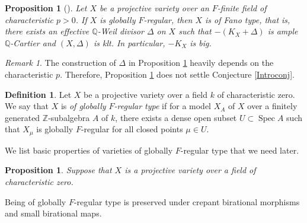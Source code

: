 \documentclass[12pt]{amsart}
\def\Spec{\operatorname{Spec}}
\newcommand{\Q}{\mathbb{Q}}
\theoremstyle{plain}
\newtheorem{prop}[thm]{Proposition}
\theoremstyle{definition}
\newtheorem{defn}[thm]{Definition}
\theoremstyle{remark}
\newtheorem{rem}[thm]{Remark}
\newtheorem{defn and notation}[thm]{Definition and Notation}
\theoremstyle{plain}
\begin{document}
\begin{prop}[\textup{\cite[Theorem 4.3]{SS10}}]\label{rem:GFR}
Let $X$ be a projective variety over an $F$-finite field of characteristic $p>0$. 
If $X$ is globally $F$-regular, then $X$ is of Fano type, that is, there exists an effective $\mathbb{Q}$-Weil divisor $\Delta$ on $X$ such that $-(K_X+\Delta)$ is ample $\Q$-Cartier and $(X,\Delta)$ is klt. 
In particular, $-K_X$ is big. 
\end{prop}

\begin{rem}
The construction of $\Delta$ in Proposition \ref{rem:GFR} heavily depends on the characteristic $p$. 
Therefore, Proposition \ref{rem:GFR} does not settle Conjecture \ref{Introconj}. 
\end{rem}

\begin{defn}
    Let $X$ be a projective variety over a field $k$ of characteristic zero.
    We say that $X$ is \textit{of globally $F$-regular type} if for a model $X_A$ of $X$ over a finitely generated $\mathbb{Z}$-subalgebra $A$ of $k$, there exists a dense open subset $U \subset \Spec A$ such that $X_{\mu}$ is globally $F$-regular for all closed points $\mu\in U$.
\end{defn}

We list basic properties of varieties of globally $F$-regular type that we  need later. 

\begin{prop}\label{thm:GFRtype to RC}\label{rem:GFRtype}
Suppose that $X$ is a projective variety over a field of characteristic zero. 
\end{prop}

Being of globally $F$-regular type is preserved under crepant birational morphisms and small birational maps.  
\end{document}
